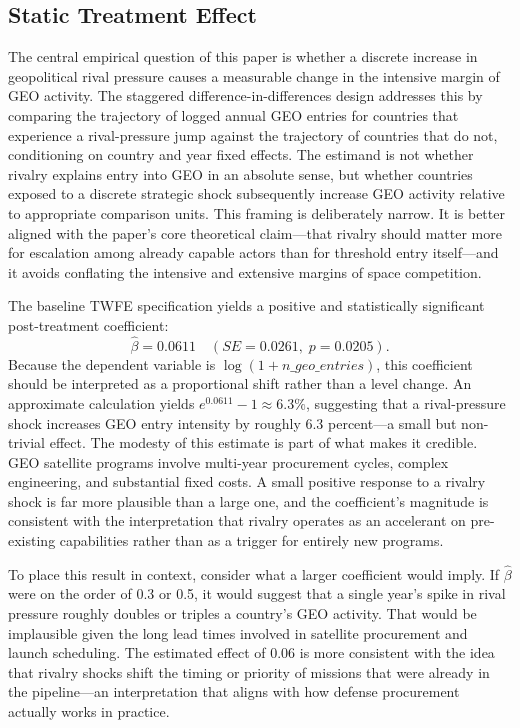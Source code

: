 \documentclass[11pt]{article}
\begin{document}
\subsection{Static Treatment Effect}

The central empirical question of this paper is whether a discrete increase in geopolitical rival pressure causes a measurable change in the intensive margin of GEO activity. The staggered difference-in-differences design addresses this by comparing the trajectory of logged annual GEO entries for countries that experience a rival-pressure jump against the trajectory of countries that do not, conditioning on country and year fixed effects. The estimand is not whether rivalry explains entry into GEO in an absolute sense, but whether countries exposed to a discrete strategic shock subsequently increase GEO activity relative to appropriate comparison units. This framing is deliberately narrow. It is better aligned with the paper's core theoretical claim---that rivalry should matter more for escalation among already capable actors than for threshold entry itself---and it avoids conflating the intensive and extensive margins of space competition.

The baseline TWFE specification yields a positive and statistically significant post-treatment coefficient:
\begin{equation}
 \hat{\beta} = 0.0611 \quad (SE = 0.0261,\; p = 0.0205).
\end{equation}
Because the dependent variable is $\log(1+n\_geo\_entries)$, this coefficient should be interpreted as a proportional shift rather than a level change. An approximate calculation yields $e^{0.0611}-1 \approx 6.3\%$, suggesting that a rival-pressure shock increases GEO entry intensity by roughly 6.3 percent---a small but non-trivial effect. The modesty of this estimate is part of what makes it credible. GEO satellite programs involve multi-year procurement cycles, complex engineering, and substantial fixed costs. A small positive response to a rivalry shock is far more plausible than a large one, and the coefficient's magnitude is consistent with the interpretation that rivalry operates as an accelerant on pre-existing capabilities rather than as a trigger for entirely new programs.

To place this result in context, consider what a larger coefficient would imply. If $\hat{\beta}$ were on the order of 0.3 or 0.5, it would suggest that a single year's spike in rival pressure roughly doubles or triples a country's GEO activity. That would be implausible given the long lead times involved in satellite procurement and launch scheduling. The estimated effect of 0.06 is more consistent with the idea that rivalry shocks shift the timing or priority of missions that were already in the pipeline---an interpretation that aligns with how defense procurement actually works in practice.
\end{document}
